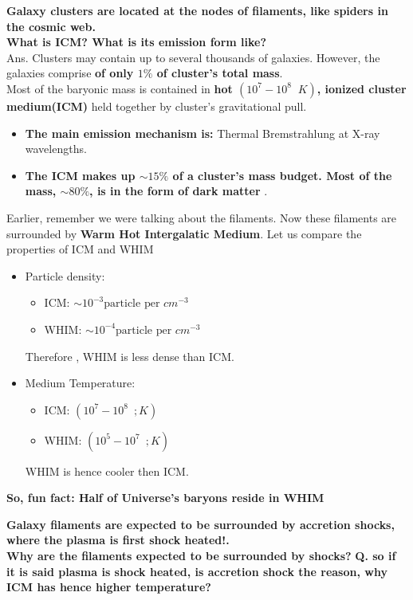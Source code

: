 \documentclass[12pt]{report}
\newcommand{\cbox}{tcolorbox}
\begin{document}
\textbf{Galaxy clusters are located at the nodes of filaments, like spiders in the cosmic web.}\\
\textbf{What is ICM? What is its emission form like?}\\
Ans. Clusters may contain up to several thousands of galaxies. However, the galaxies comprise \textbf{of only $1\%$ of cluster's total mass}.\\
Most of the baryonic mass is contained in \textbf{hot $(10^7-10^8 \;\; K)$, ionized cluster medium(ICM)} held together by cluster's gravitational pull.\\
\begin{itemize}
\item \textbf{The main emission mechanism is:} Thermal Bremstrahlung at X-ray wavelengths. 
\item \textbf{ The ICM makes up $\sim 15\%$ of a cluster’s mass budget. Most of the mass, $\sim 80\%$, is in the form of dark matter }.
\end{itemize}
Earlier, remember we were talking about the filaments. Now these filaments are surrounded by \textbf{Warm Hot Intergalatic Medium}. Let us compare the properties of ICM and WHIM
\begin{itemize}
\item Particle density: 
\begin{itemize}
\item ICM: $\sim 10^{-3} \text{particle per } cm^{-3}$
\item WHIM: $\sim 10^{-4} \text{particle per } cm^{-3}$
\end{itemize} 
Therefore , WHIM is less dense than ICM.
\item Medium Temperature:
\begin{itemize}
\item ICM: $(10^7 -10^8 \;\ ; K)$
\item WHIM: $(10^5 -10^7 \;\ ; K)$
\end{itemize}
WHIM is hence cooler then ICM.
\end{itemize}
\begin{\cbox}
\textbf{So, fun fact: Half of Universe's baryons reside in WHIM}
\end{\cbox}
\begin{\cbox}
\textbf{Galaxy filaments are expected to be surrounded by accretion shocks, where the plasma is first shock heated!.}\\
\textbf{Why are the filaments expected to be surrounded by shocks?}
\textbf{Q. so if it is said plasma is shock heated, is accretion shock the reason, why ICM has hence higher temperature?}
\end{\cbox}
\end{document}
